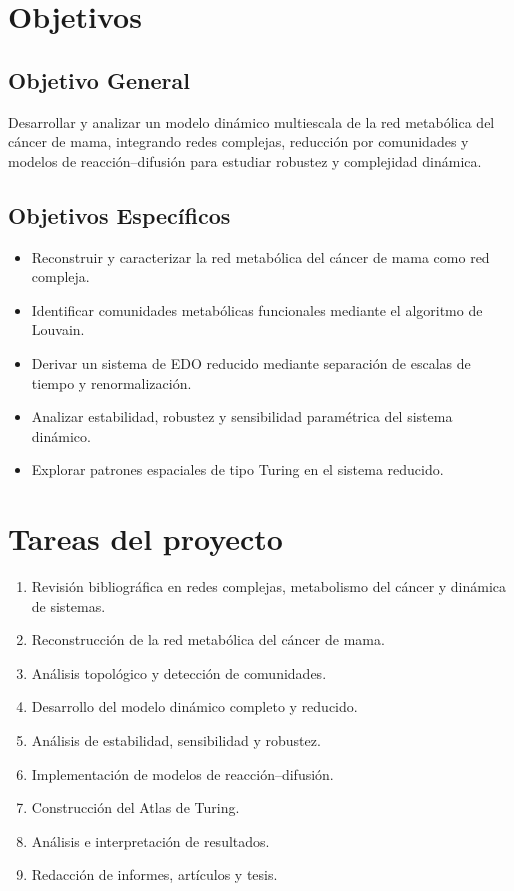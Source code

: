 \documentclass[12pt,spanish]{report}
\begin{document}
	\section{Objetivos}
	
	\subsection{Objetivo General}
	Desarrollar y analizar un modelo dinámico multiescala de la red metabólica del cáncer de mama, integrando redes complejas, reducción por comunidades y modelos de reacción--difusión para estudiar robustez y complejidad dinámica.
	
	\subsection{Objetivos Específicos}
	\begin{itemize}
		\item Reconstruir y caracterizar la red metabólica del cáncer de mama como red compleja.
		\item Identificar comunidades metabólicas funcionales mediante el algoritmo de Louvain.
		\item Derivar un sistema de EDO reducido mediante separación de escalas de tiempo y renormalización.
		\item Analizar estabilidad, robustez y sensibilidad paramétrica del sistema dinámico.
		\item Explorar patrones espaciales de tipo Turing en el sistema reducido.
	\end{itemize}
	
	\section{Tareas del proyecto}
	
	\begin{enumerate}
		\item Revisión bibliográfica en redes complejas, metabolismo del cáncer y dinámica de sistemas.
		\item Reconstrucción de la red metabólica del cáncer de mama.
		\item Análisis topológico y detección de comunidades.
		\item Desarrollo del modelo dinámico completo y reducido.
		\item Análisis de estabilidad, sensibilidad y robustez.
		\item Implementación de modelos de reacción--difusión.
		\item Construcción del Atlas de Turing.
		\item Análisis e interpretación de resultados.
		\item Redacción de informes, artículos y tesis.
	\end{enumerate}
\end{document}

